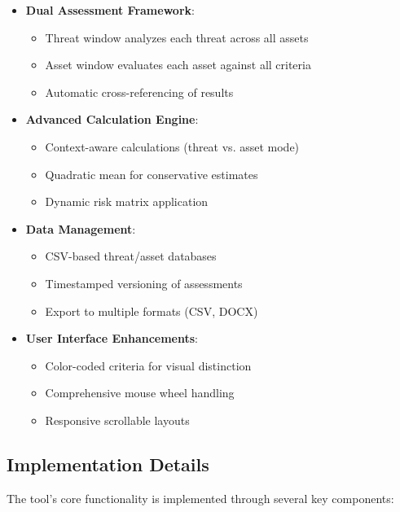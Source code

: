 \documentclass[binding=0.6cm]{sapthesis}
\begin{document}
\begin{itemize}
\item \textbf{Dual Assessment Framework}:
\begin{itemize}
\item Threat window analyzes each threat across all assets
\item Asset window evaluates each asset against all criteria
\item Automatic cross-referencing of results
\end{itemize}

\item \textbf{Advanced Calculation Engine}:
\begin{itemize}
    \item Context-aware calculations (threat vs. asset mode)
    \item Quadratic mean for conservative estimates
    \item Dynamic risk matrix application
\end{itemize}

\item \textbf{Data Management}:
\begin{itemize}
    \item CSV-based threat/asset databases
    \item Timestamped versioning of assessments
    \item Export to multiple formats (CSV, DOCX)
\end{itemize}

\item \textbf{User Interface Enhancements}:
\begin{itemize}
    \item Color-coded criteria for visual distinction
    \item Comprehensive mouse wheel handling
    \item Responsive scrollable layouts
\end{itemize}
\end{itemize}

\subsection{Implementation Details}

The tool's core functionality is implemented through several key components:
\end{document}
